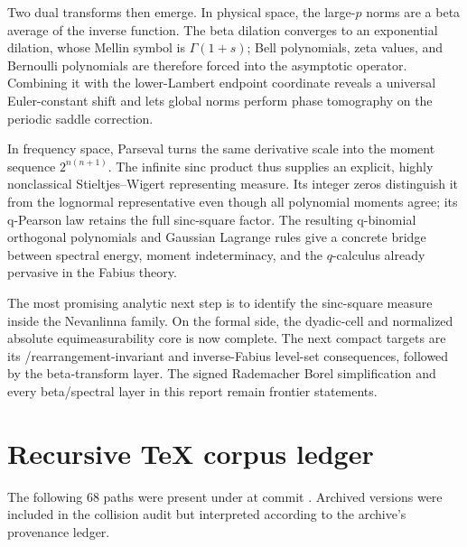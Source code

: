 \documentclass[11pt,oneside]{article}
\theoremstyle{definition}
\theoremstyle{remark}
\begin{document}
Two dual transforms then emerge.  In physical space, the large-$p$ norms are a beta average
of the inverse function.  The beta dilation converges to an exponential dilation, whose
Mellin symbol is $\Gamma(1+s)$; Bell polynomials, zeta values, and Bernoulli polynomials are
therefore forced into the asymptotic operator.  Combining it with the lower-Lambert endpoint
coordinate reveals a universal Euler-constant shift and lets global norms perform phase
tomography on the periodic saddle correction.

In frequency space, Parseval turns the same derivative scale into the moment sequence
$2^{n(n+1)}$.  The infinite sinc product thus supplies an explicit, highly nonclassical
Stieltjes--Wigert representing measure.  Its integer zeros distinguish it from the lognormal
representative even though all polynomial moments agree; its q-Pearson law retains the full
sinc-square factor.  The resulting q-binomial orthogonal polynomials and Gaussian Lagrange
rules give a concrete bridge between spectral energy, moment indeterminacy, and the
$q$-calculus already pervasive in the Fabius theory.

The most promising analytic next step is to identify the sinc-square measure inside the
Nevanlinna family.  On the formal side, the dyadic-cell and normalized absolute
equimeasurability core is now complete.  The next compact targets are its
/rearrangement-invariant and inverse-Fabius level-set consequences, followed
by the beta-transform layer.  The signed Rademacher Borel simplification and every
beta/spectral layer in this report remain frontier statements.

\appendix

\section{Recursive TeX corpus ledger}
\label{p4:app:corpus-ledger}

The following $68$ paths were present under
 at commit \RepoCommit.  Archived versions were included
in the collision audit but interpreted according to the archive's provenance ledger.
\end{document}
